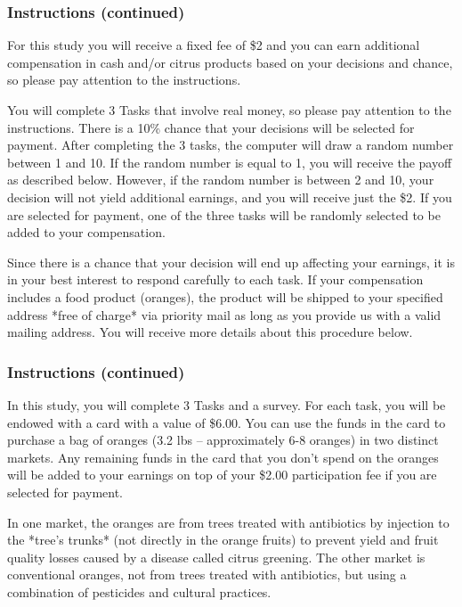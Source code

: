 \documentclass[12pt]{article}
\begin{document}
{\subsubsection*{\textbf{Instructions (continued)}}


For this study you will receive a fixed fee of \$2 and you can earn additional compensation in cash and/or citrus products based on your decisions and chance, so please pay attention to the instructions.
 
You will complete 3 Tasks that involve real money, so please pay attention to the instructions. There is a 10\% chance that your decisions will be selected for payment. After completing the 3 tasks, the computer will draw a random number between 1 and 10. If the random number is equal to 1, you will receive the payoff as described below. However, if the random number is between 2 and 10, your decision will not yield additional earnings, and you will receive just the \$2. If you are selected for payment, one of the three tasks will be randomly selected to be added to your compensation.

 Since there is a chance that your decision will end up affecting your earnings, it is in your best interest to respond carefully to each task. If your compensation includes a food product (oranges), the product will be shipped to your specified address *free of charge* via priority mail as long as you provide us with a valid mailing address. You will receive more details about this procedure below.

\clearpage

\subsubsection*{\textbf{Instructions (continued)}}

In this study, you will complete 3 Tasks and a survey.
For each task, you will be endowed with a card with a value of \$6.00. You can use the funds in the card to purchase a bag of oranges (3.2 lbs – approximately 6-8 oranges) in two distinct markets. Any remaining funds in the card that you don’t spend on the oranges will be added to your earnings on top of your \$2.00 participation fee if you are selected for payment.



In one market, the oranges are from trees treated with antibiotics by injection to the *tree’s trunks* (not directly in the orange fruits) to prevent yield and fruit quality losses caused by a disease called citrus greening. The other market is conventional oranges, not from trees treated with antibiotics, but using a combination of pesticides and cultural practices.


}
\end{document}
